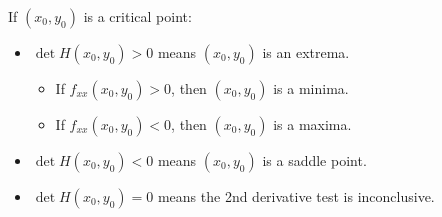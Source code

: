 \noindent
If $(x_0, y_0)$ is a critical point:
\begin{itemize}
	\item $\det{H(x_0,y_0) > 0}$ means $(x_0, y_0)$ is an extrema. 
	\begin{itemize}
		\item If $f_{xx}(x_0, y_0) > 0$, then $(x_0, y_0)$ is a minima.
		\item If $f_{xx}(x_0, y_0) < 0$, then $(x_0, y_0)$ is a maxima.
	\end{itemize}
	\item $\det{H(x_0, y_0)} < 0$ means $(x_0, y_0)$ is a saddle point.
	\item $\det{H(x_0, y_0)} = 0$ means the 2nd derivative test is inconclusive.
\end{itemize}
